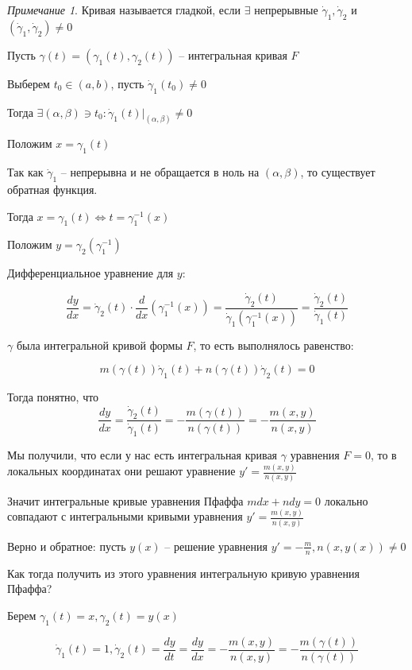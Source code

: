 \documentclass[a4paper]{article}
\theoremstyle{indented}
\theoremstyle{definition}
\theoremstyle{remark}
\newtheorem*{remark}{Примечание}
\begin{document}
\begin{remark}
  Кривая называется гладкой, если $\exists $ непрерывные $\dot \gamma_1, \dot \gamma_2$ и $(\dot \gamma_1, \dot \gamma_2) \neq 0$
\end{remark}



Пусть $\gamma(t) = (\gamma_1(t), \gamma_2(t))$ -- интегральная кривая $F$

Выберем $t_0 \in (a,b)$, пусть $\dot \gamma_1(t_0) \neq 0$

Тогда $\exists (\alpha, \beta) \ni t_0: \dot \gamma_1(t)|_{(\alpha, \beta)} \neq 0$

Положим $x = \gamma_1(t)$

Так как $\dot \gamma_1$ -- непрерывна и не обращается в ноль на $(\alpha, \beta)$,  то существует обратная функция.

Тогда $x = \gamma_1(t) \Longleftrightarrow t = \gamma_1^{-1}(x)$

Положим $y = \gamma_2(\gamma_1^{-1})$

Дифференциальное уравнение для $y$:

\[\frac{dy}{dx} = \dot \gamma_2(t) \cdot \frac{d}{dx} (\gamma_1^{-1}(x)) = \frac{\dot \gamma_2(t)}{\dot \gamma_1(\gamma_1^{-1}(x))} = \frac{\dot \gamma_2(t)}{\dot \gamma_1(t)}
\]

$\gamma$ была интегральной кривой формы $F$, то есть выполнялось равенство:

\[m(\gamma(t)) \dot \gamma_1(t) + n(\gamma(t)) \dot \gamma_2(t) = 0\]

Тогда понятно, что
\[\frac{dy}{dx} = \frac{\dot \gamma_2(t)}{\dot \gamma_1(t)}  = - \frac{m(\gamma(t))}{n(\gamma(t))} = - \frac{m(x,y)}{n(x,y)}\]

Мы получили, что если у нас есть интегральная кривая $\gamma$ уравнения $F = 0$, то в локальных координатах они решают уравнение $y' = \frac{m(x,y)}{n(x,y)}$

Значит  интегральные кривые уравнения Пфаффа $m dx + n dy = 0$ локально совпадают с интегральными кривыми уравнения $y' = \frac{m(x,y)}{n(x,y)}$

Верно и обратное: пусть $y(x)$ -- решение уравнения $y' = - \frac{m}{n}, n(x,y(x)) \neq 0$

Как тогда получить из этого уравнения интегральную кривую уравнения Пфаффа?

Берем $\gamma_1(t) = x, \gamma_2(t) = y(x)$

\[ \dot \gamma_1(t) = 1, \dot \gamma_2(t) = \frac{dy}{dt} = \frac{dy}{dx} = - \frac{m(x,y)}{n(x,y)} = - \frac{m(\gamma(t))}{n(\gamma(t))}\]
\end{document}
